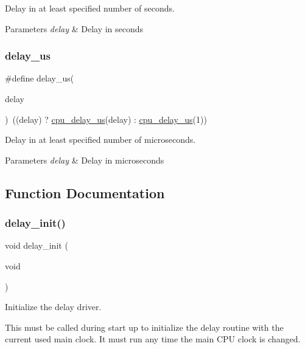 Delay in at least specified number of seconds. 


\begin{DoxyParams}{Parameters}
{\em delay} & Delay in seconds \\
\hline
\end{DoxyParams}
\mbox{\label{group__group__common__services__delay_gaf9a0c0e0f880d818a4c2c3ea9fe8cba1}} 
\subsubsection{\texorpdfstring{delay\_us}{delay\_us}}
{\footnotesize\ttfamily \#define delay\+\_\+us(\begin{DoxyParamCaption}\item[{}]{delay }\end{DoxyParamCaption})~((delay) ? \mbox{\hyperlink{systick__counter_8h_a25de6f000bcc542a5f3292e369e49681}{cpu\+\_\+delay\+\_\+us}}(delay) \+: \mbox{\hyperlink{systick__counter_8h_a25de6f000bcc542a5f3292e369e49681}{cpu\+\_\+delay\+\_\+us}}(1))}



Delay in at least specified number of microseconds. 


\begin{DoxyParams}{Parameters}
{\em delay} & Delay in microseconds \\
\hline
\end{DoxyParams}


\subsection{Function Documentation}
\mbox{\label{group__group__common__services__delay_gaf3c040fe31e69be32855715a75e0cda4}} 
\subsubsection{\texorpdfstring{delay\_init()}{delay\_init()}}
{\footnotesize\ttfamily void delay\+\_\+init (\begin{DoxyParamCaption}\item[{void}]{ }\end{DoxyParamCaption})}



Initialize the delay driver. 

This must be called during start up to initialize the delay routine with the current used main clock. It must run any time the main C\+PU clock is changed. 